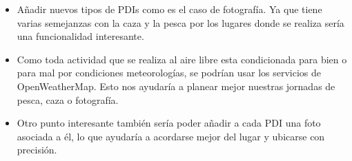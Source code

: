 \begin{itemize}
\item Añadir nuevos tipos de PDIs como es el caso de fotografía. Ya que tiene varias semejanzas con la caza y la pesca por los lugares donde se realiza sería una funcionalidad interesante.
\item Como toda actividad que se realiza al aire libre esta condicionada para bien o para mal por condiciones meteorologías, se podrían usar los servicios de OpenWeatherMap. Esto nos ayudaría a planear mejor nuestras jornadas de pesca, caza o fotografía.


\item Otro punto interesante también sería poder añadir a cada PDI una foto asociada a él, lo que ayudaría a acordarse mejor del lugar y ubicarse con precisión.
\end{itemize}
